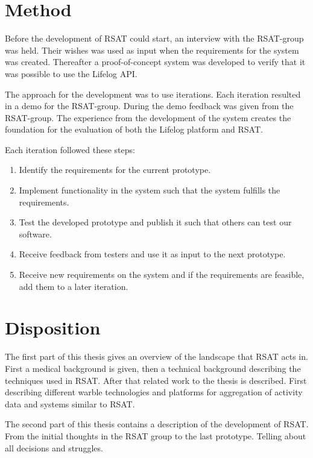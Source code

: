 \documentclass{cslthse-msc}
\begin{document}
\section{Method}
Before the development of RSAT could start, an interview with the RSAT-group was held. Their wishes was used as input when the requirements for the system was created. 
Thereafter a proof-of-concept system was developed to verify that it was possible to use the Lifelog API.

The approach for the development was to use iterations. Each iteration resulted in a demo for the RSAT-group. During the demo feedback was given from the RSAT-group. The experience from the development of the system creates the foundation for the evaluation of both the Lifelog platform and RSAT.

Each iteration followed these steps: 

\begin{enumerate}
\item Identify the requirements for the current prototype.
\item Implement functionality in the system such that the system fulfills the requirements.
\item Test the developed prototype and publish it such that others can test our software.
\item Receive feedback from testers and use it as input to the next prototype. 
\item Receive new requirements on the system and if the requirements are feasible, add them to a later iteration. 
\end{enumerate}



\section{Disposition}

The first part of this thesis gives an overview of the landscape that RSAT acts in. First a medical background is given, then a technical background describing the techniques used in RSAT. After that related work to the thesis is described. First describing  different warble technologies and platforms for aggregation of activity data and  systems similar to RSAT. 

The second part of this thesis contains a description of the development of RSAT. From the initial thoughts in the RSAT group to the last prototype. Telling about all decisions and struggles.  
\end{document}
